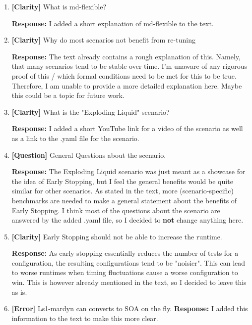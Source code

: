 \documentclass[12pt,a4paper]{article}
\begin{document}
\begin{enumerate}[label=\textbf{Comment \arabic*:}, itemsep=0.8em]
    \item \textbf{[Clarity]} What is md-flexible?

          \textbf{Response:} I added a short explanation of md-flexible to the text.

    \item \textbf{[Clarity]} Why do most scenarios not benefit from re-tuning

          \textbf{Response:} The text already contains a rough explanation of this. Namely, that many scenarios tend to be stable over time. I'm unaware of any rigorous proof of this / which formal conditions need to be met for this to be true. Therefore, I am unable to provide a more detailed explanation here. Maybe this could be a topic for future work.

    \item \textbf{[Clarity]} What is the "Exploding Liquid" scenario?

          \textbf{Response:} I added a short YouTube link for a video of the scenario as well as a link to the .yaml file for the scenario.

    \item \textbf{[Question]} General Questions about the scenario.

          \textbf{Response:}
          The Exploding Liquid scenario was just meant as a showcase for the idea of Early Stopping, but I feel the general benefits would be quite similar for other scenarios. As stated in the text, more (scenario-specific) benchmarks are needed to make a general statement about the benefits of Early Stopping.
          I think most of the questions about the scenario are answered by the added .yaml file, so I decided to \textbf{not} change anything here.

    \item \textbf{[Clarity]} Early Stopping should not be able to increase the runtime.

          \textbf{Response:} As early stopping essentially reduces the number of tests for a configuration, the resulting configurations tend to be "noisier". This can lead to worse runtimes when timing fluctuations cause a worse configuration to win. This is however already mentioned in the text, so I decided to leave this as is.

    \item \textbf{[Error]} Ls1-mardyn can converts to SOA on the fly.
          \textbf{Response:} I added this information to the text to make this more clear.



\end{enumerate}
\end{document}
